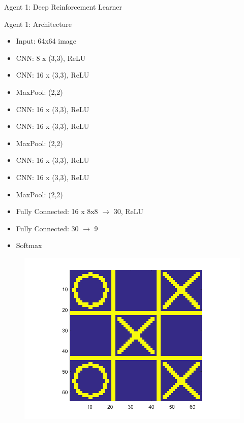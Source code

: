 \documentclass[11pt]{beamer}
\begin{document}
\begin{frame}{Agent 1: Deep Reinforcement Learner}
\begin{minipage}[t]{0.4\linewidth}
\begin{figure}[tttDL]
		\end{figure}
	\end{minipage}
\end{frame}

\begin{frame}{Agent 1: Architecture}
	\begin{minipage}[t]{0.68\linewidth}
		\begin{itemize}
			\item Input: 64x64 image
			\item CNN: 8  x (3,3), ReLU
			\item[] CNN: 16 x (3,3), ReLU
			\item[] MaxPool: (2,2)
			\item CNN: 16 x (3,3), ReLU
			\item[] CNN: 16 x (3,3), ReLU
			\item[] MaxPool: (2,2)
			\item CNN: 16 x (3,3), ReLU
			\item[] CNN: 16 x (3,3), ReLU
			\item[] MaxPool: (2,2)
			\item Fully Connected: 16 x 8x8 $\rightarrow$ 30, ReLU
			\item Fully Connected: 30 $\rightarrow$ 9
			\item Softmax
		\end{itemize}
	\end{minipage}
	\hfill
	\begin{minipage}[t]{0.3\linewidth}
		\centering
		\begin{figure}[tttDL]
			\centering
			\includegraphics[width=1.5\textwidth]{Figures/boardExample.png}
		\end{figure}
	\end{minipage}
\end{frame}
\end{document}
